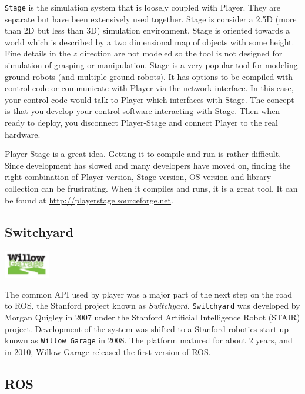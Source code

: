 \texttt{Stage} is the simulation system that is loosely coupled with
Player. They are separate but have been extensively used together. Stage
is consider a 2.5D (more than 2D but less than 3D) simulation
environment. Stage is oriented towards a world which is described by a
two dimensional map of objects with some height. Fine details in the
\(z\) direction are not modeled so the tool is not designed for
simulation of grasping or manipulation. Stage is a very popular tool for
modeling ground robots (and multiple ground robots). It has options to
be compiled with control code or communicate with Player via the network
interface. In this case, your control code would talk to Player which
interfaces with Stage. The concept is that you develop your control
software interacting with Stage. Then when ready to deploy, you
disconnect Player-Stage and connect Player to the real hardware.

Player-Stage is a great idea. Getting it to compile and run is rather
difficult. Since development has slowed and many developers have moved
on, finding the right combination of Player version, Stage version, OS
version and library collection can be frustrating. When it compiles and
runs, it is a great tool. It can be found at
\url{http://playerstage.sourceforge.net}.

\hypertarget{switchyard}{%
\subsection{Switchyard}\label{switchyard}}

\includegraphics[width=0.15\textwidth,height=\textheight]{ToolsFigures/willow_garage.jpg}

The common API used by player was a major part of the next step on the
road to ROS, the Stanford project known as \emph{Switchyard.}
\texttt{Switchyard} was developed by Morgan Quigley in 2007 under the
Stanford Artificial Intelligence Robot (STAIR) project. Development of
the system was shifted to a Stanford robotics start-up known as
\texttt{Willow\ Garage} in 2008. The platform matured for about 2 years,
and in 2010, Willow Garage released the first version of ROS.

\hypertarget{ros}{%
\subsection{ROS}\label{ros}}

